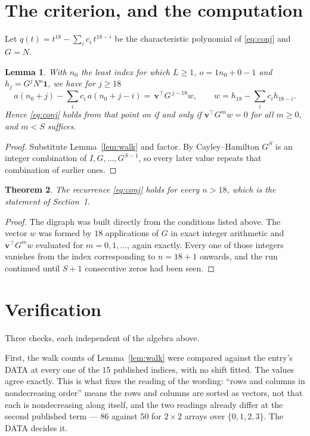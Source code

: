 \documentclass[11pt,a4paper]{article}
\theoremstyle{plain}
\newtheorem{theorem}{Theorem}
\newtheorem{lemma}[theorem]{Lemma}
\theoremstyle{definition}
\begin{document}
\section{The criterion, and the computation}

Let $q(t)=t^{18}-\sum_i c_i\,t^{18-i}$ be the characteristic polynomial of
\eqref{eq:conj} and $G=N$.

\begin{lemma}\label{lem:crit}
With $n_0$ the least index for which $L\ge1$, $o=1n_0+0-1$ and
$h_j=G^{j}N^{o}\mathbf{1}$, we have for $j\ge18$
\[
a(n_0+j)-\sum_i c_i\,a(n_0+j-i)=\,\mathbf{v}^{\!\top}G^{\,j-18}w,
\qquad w=h_{18}-\sum_i c_ih_{18-i} .
\]
Hence \eqref{eq:conj} holds from that point on if and only if
$\mathbf{v}^{\!\top}G^{m}w=0$ for all $m\ge0$, and $m<S$ suffices.
\end{lemma}

\begin{proof}
Substitute Lemma~\ref{lem:walk} and factor. By Cayley--Hamilton $G^{S}$ is an integer
combination of $I,G,\dots,G^{S-1}$, so every later value repeats that combination of
earlier ones.
\end{proof}

\begin{theorem}
The recurrence \eqref{eq:conj} holds for every $n>18$, which is the statement of
Section~1.
\end{theorem}

\begin{proof}
The digraph was built directly from the conditions listed above. The vector $w$ was formed by
$18$ applications of $G$ in exact integer arithmetic and $\mathbf{v}^{\!\top}G^{m}w$
evaluated for $m=0,1,\dots$, again exactly. Every one of those integers vanishes from the
index corresponding to $n=18+1$ onwards, and the run continued until $S+1$ consecutive
zeros had been seen.
\end{proof}

\section{Verification}

Three checks, each independent of the algebra above.

First, the walk counts of Lemma~\ref{lem:walk} were compared against the entry's DATA at
every one of the $15$ published indices, with no shift fitted. The values agree exactly.
This is what fixes the reading of the wording: ``rows and columns in nondecreasing order''
means the rows and columns are sorted as vectors, not that each is nondecreasing along
itself, and the two readings already differ at the second published term --- $86$ against
$50$ for $2\times2$ arrays over $\{0,1,2,3\}$. The DATA decides it.
\end{document}
